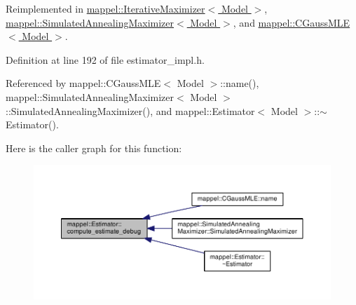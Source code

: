 Reimplemented in \hyperlink{classmappel_1_1IterativeMaximizer_aa45c11a399f29985fc9bd3365e809335}{mappel\+::\+Iterative\+Maximizer$<$ Model $>$}, \hyperlink{classmappel_1_1SimulatedAnnealingMaximizer_a146eedb2f0e4b4a6839c16b288ab7f75}{mappel\+::\+Simulated\+Annealing\+Maximizer$<$ Model $>$}, and \hyperlink{classmappel_1_1CGaussMLE_a6bf98b8144f4cd5f548b49f32a95141e}{mappel\+::\+C\+Gauss\+M\+L\+E$<$ Model $>$}.



Definition at line 192 of file estimator\+\_\+impl.\+h.



Referenced by mappel\+::\+C\+Gauss\+M\+L\+E$<$ Model $>$\+::name(), mappel\+::\+Simulated\+Annealing\+Maximizer$<$ Model $>$\+::\+Simulated\+Annealing\+Maximizer(), and mappel\+::\+Estimator$<$ Model $>$\+::$\sim$\+Estimator().



Here is the caller graph for this function\+:\nopagebreak
\begin{figure}[H]
\begin{center}
\leavevmode
\includegraphics[width=350pt]{classmappel_1_1Estimator_a29c41d423941e8b86add3e493cb1375e_icgraph}
\end{center}
\end{figure}


